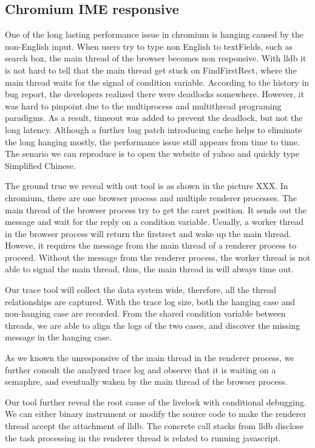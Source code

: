 \subsection{Chromium IME responsive}
One of the long lasting performance issue in chromium is hanging caused by the non-English input.
When users try to type non English to textFields, such as search box,
the main thread of the browser becomes non responsive.
With lldb it is not hard to tell that the main thread get stuck on FindFirstRect,
where the main thread waits for the signal of condition variable.
According to the history in bug report, the developers realized there were deadlocks somewhere.
However, it was hard to pinpoint due to the multiprocess and multithread programing paradigms.
As a result, timeout was added to prevent the deadlock, but not the long latency.
Although a further bug patch introducing cache helps to eliminate the long hanging mostly, 
the performance issue still appears from time to time.
The senario we can reproduce is to open the website of yahoo and quickly type Simplified Chinese.

The ground true we reveal with out tool is as shown in the picture XXX.
In chromium, there are one browser process and multiple renderer processes.
The main thread of the browser process try to get the caret position.
It sends out the message and wait for the reply on a condition variable.
Usually, a worker thread in the browser process will return the firstrect and wake up the main thread.
Howeve, it requires the message from the main thread of a renderer process to proceed.
Without the message from the renderer process, the worker thread is not able to signal the main thread,
thus, the main thread in will always time out.

Our trace tool will collect the data system wide, therefore, all the thread relationships are captured.
With the trace log size, both the hanging case and non-hanging case are recorded.
From the shared condition variable between threads, we are able to align the logs of the two cases,
and discover the missing message in the hanging case.

As we known the unresponsive of the main thread in the renderer process,
we further consult the analyzed trace log and observe that it is waiting on a semaphre,
and eventually waken by the main thread of the browser process.

Our tool further reveal the root cause of the livelock with conditional debugging.
We can either binary instrument or modify the source code to make the renderer thread accept the attachment of lldb.
The concrete call stacks from lldb disclose the task processing in the renderer thread is related to running javascript.
